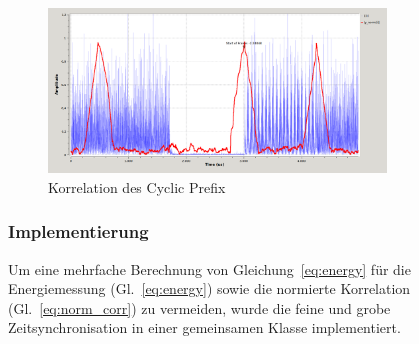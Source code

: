 \begin{figure}[h]
\centering
  \includegraphics[width=0.8\textwidth]{figures/delayed_correlation_abs_and_energy.png}
	\caption{Korrelation des Cyclic Prefix}
	\label{fig:corr}
\end{figure}

\subsubsection{Implementierung}
Um eine mehrfache Berechnung von Gleichung~\ref{eq:energy} für die Energiemessung (Gl.~\ref{eq:energy}) sowie die normierte Korrelation (Gl.~\ref{eq:norm_corr}) zu vermeiden, wurde die feine und grobe Zeitsynchronisation in einer gemeinsamen Klasse implementiert.

